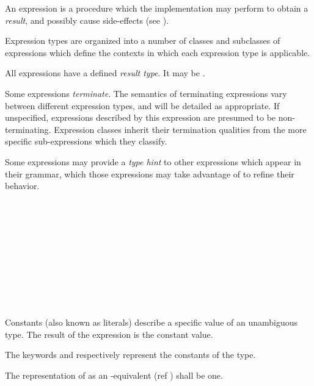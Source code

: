 
\specsubitem
An expression is a procedure which the implementation may perform to obtain a
\textit{result}, and possibly cause side-effects (see
).

\specsubitem
Expression types are organized into a number of classes and subclasses of
expressions which define the contexts in which each expression type is
applicable.

\specsubitem
All expressions have a defined \textit{result type}. It may be .

\specsubitem
Some expressions \textit{terminate}. The semantics of terminating expressions
vary between different expression types, and will be detailed as appropriate.
If unspecified, expressions described by this expression are presumed to be
non-terminating. Expression classes inherit their termination qualities from the
more specific sub-expressions which they classify.

\specsubitem
Some expressions may provide a \textit{type hint} to other expressions which
appear in their grammar, which those expressions may take advantage of to
refine their behavior.


\begin{grammar}
 \\
	 \\
	 \\
	 \\
	 \\
	 \\
	 \\
	 \\
	 \\
\end{grammar}

\specsubsubitem
Constants (also known as literals) describe a specific value of an unambiguous
type. The result of the expression is the constant value.

\specsubsubitem
The keywords  and  respectively represent
the constants of the  type.

\specsubsubitem
The representation of  as an -equivalent (ref
) shall be one.

